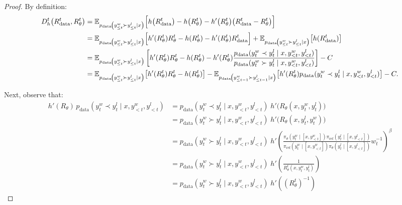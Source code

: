 \documentclass{article}
\theoremstyle{plain}
\theoremstyle{definition}
\theoremstyle{remark}
\begin{document}
\begin{proof}
By definition:
\begin{align}
D_{h}^{t}\!\left(R_{\text{data}}^{t},R_{\theta}^{t}\right)
&= \mathbb{E}_{p_{\text{data}}\!\left(y_{\leq t}^{w}\succ y_{\leq t}^{l}\mid x\right)}
\Bigl[
h\!\left(R_{\text{data}}^{t}\right)-h\!\left(R_{\theta}^{t}\right)
- h'\!\left(R_{\theta}^{t}\right)\!\left(R_{\text{data}}^{t}-R_{\theta}^{t}\right)
\Bigr] \nonumber\\
&= \mathbb{E}_{p_{\text{data}}\!\left(y_{\leq t}^{w}\succ y_{\leq t}^{l}\mid x\right)}
\Bigl[h'(R_\theta^t)R_\theta^t - h(R_\theta^t) - h'(R_\theta^t)R_{\text{data}}^t\Bigr]
+ \mathbb{E}_{p_{\text{data}}\!\left(y_{\leq t}^{w}\succ y_{\leq t}^{l}\mid x\right)}\bigl[h(R_{\text{data}}^t)\bigr] \nonumber \\
&= \mathbb{E}_{p_{\text{data}}\!\left(y_{\leq t}^{w}\succ y_{\leq t}^{l}\mid x\right)}
\left[
h'(R_\theta^t)R_\theta^t - h(R_\theta^t)
- h'(R_\theta^t)\frac{p_\text{data}(y_{t}^{w}\prec y_{t}^{l}\mid x,y_{<t}^{w},y_{<t}^{l})}{p_\text{data}(y_{t}^{w}\succ y_{t}^{l}\mid x,y_{<t}^{w},y_{<t}^{l})}
\right] - C \nonumber \\
&= \mathbb{E}_{p_{\text{data}}\!\left(y_{\leq t}^{w}\succ y_{\leq t}^{l}\mid x\right)}\!\left[h'(R_\theta^t)R_\theta^t - h(R_\theta^t)\right]
- \mathbb{E}_{p_{\text{data}}\!\left(y_{\leq t-1}^{w}\succ y_{\leq t-1}^{l}\mid x\right)}\!\left[h'(R_\theta^t)p_\text{data}(y_{t}^{w}\prec y_{t}^{l}\mid x,y_{<t}^{w},y_{<t}^{l})\right] - C .
\label{eq:Dh-prefix}
\end{align}


Next, observe that:
\[
\begin{aligned}
h'(R_\theta)\,p_\text{data}(y_{t}^{w}\prec y_{t}^{l}\mid x,y_{<t}^{w},y_{<t}^{l})
&= p_\text{data}(y_{t}^{w}\prec y_{t}^{l}\mid x,y_{<t}^{w},y_{<t}^{l})\;
   h'\!\bigl(R_\theta(x, y^w_t, y^l_t)\bigr) \\
&= p_\text{data}(y_{t}^{w}\succ y_{t}^{l}\mid x,y_{<t}^{w},y_{<t}^{l})\;
   h'\!\bigl(R_\theta(x, y^l_t, y^w_t)\bigr)\, \\
&= p_\text{data}(y_{t}^{w}\succ y_{t}^{l}\mid x,y_{<t}^{w},y_{<t}^{l})\;
h'\left(\frac{\pi_{\theta}\left(y_{t}^{w}\mid[x,y_{<t}^{w}]\right)\pi_{\mathrm{ref}}\!\left(y_{t}^{l}\mid[x,y_{<t}^{l}]\right)}{\pi_{\mathrm{ref}}\!\left(y_{t}^{w}\mid[x,y_{<t}^{w}]\right)\pi_{\theta}\!\left(y_{t}^{l}\mid[x,y_{<t}^{l}]\right)}w_{t}^{-1}\right)^{\beta} \\
&= p_\text{data}(y_{t}^{w}\succ y_{t}^{l}\mid x,y_{<t}^{w},y_{<t}^{l})\;
h'\left(\frac{1}{R_\theta^t(x, y^w_t, y^l_t)}\right) \\
&= p_\text{data}(y_{t}^{w}\succ y_{t}^{l}\mid x,y_{<t}^{w},y_{<t}^{l})\;
h'((R_\theta^t)^{-1})
\end{aligned}
\]


\end{proof}
\end{document}
